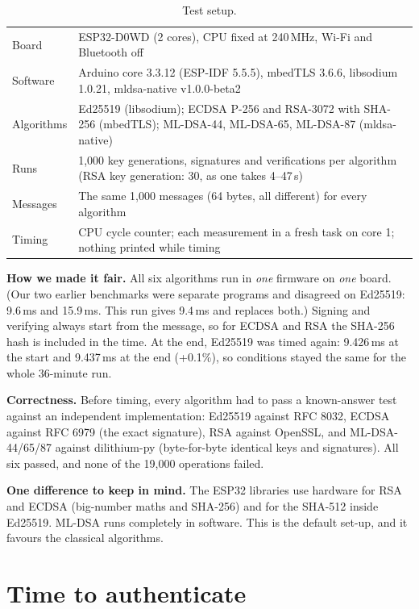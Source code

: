 \documentclass[10pt,a4paper]{article}
\begin{document}
\begin{table}[H]
\centering\small
\begin{tabularx}{\textwidth}{@{}l X@{}}
\toprule
Board & ESP32-D0WD (2 cores), CPU fixed at 240\,MHz, Wi-Fi and Bluetooth off \\
Software & Arduino core 3.3.12 (ESP-IDF 5.5.5), mbedTLS 3.6.6, libsodium 1.0.21,
           mldsa-native v1.0.0-beta2 \\
Algorithms & Ed25519 (libsodium); ECDSA P-256 and RSA-3072 with SHA-256 (mbedTLS); ML-DSA-44,
             ML-DSA-65, ML-DSA-87 (mldsa-native) \\
Runs & 1,000 key generations, signatures and verifications per algorithm (RSA key generation:
       30, as one takes 4--47\,s) \\
Messages & The same 1,000 messages (64 bytes, all different) for every algorithm \\
Timing & CPU cycle counter; each measurement in a fresh task on core 1; nothing printed while timing \\
\bottomrule
\end{tabularx}
\caption{Test setup.}
\end{table}

\textbf{How we made it fair.} All six algorithms run in \emph{one} firmware on \emph{one} board.
(Our two earlier benchmarks were separate programs and disagreed on Ed25519: 9.6\,ms and
15.9\,ms. This run gives 9.4\,ms and replaces both.) Signing and verifying always start from the
message, so for ECDSA and RSA the SHA-256 hash is included in the time. At the end, Ed25519 was
timed again: 9.426\,ms at the start and 9.437\,ms at the end (+0.1\%), so conditions stayed the
same for the whole 36-minute run.

\textbf{Correctness.} Before timing, every algorithm had to pass a known-answer test against an
independent implementation: Ed25519 against RFC 8032, ECDSA against RFC 6979 (the exact
signature), RSA against OpenSSL, and ML-DSA-44/65/87 against dilithium-py (byte-for-byte
identical keys and signatures). All six passed, and none of the 19,000 operations failed.

\textbf{One difference to keep in mind.} The ESP32 libraries use hardware for RSA and ECDSA
(big-number maths and SHA-256) and for the SHA-512 inside Ed25519. ML-DSA runs completely in
software. This is the default set-up, and it favours the classical algorithms.

\section{Time to authenticate}
\end{document}
